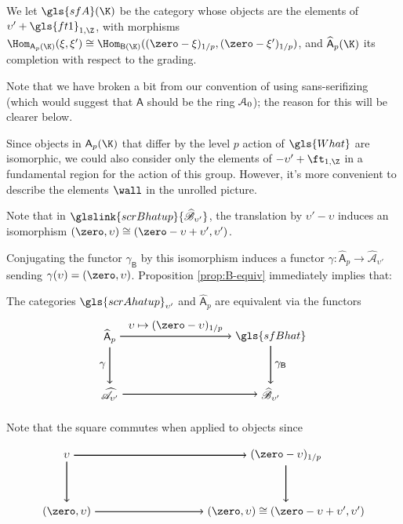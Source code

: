 \begin{definition}\label{def:sfA}
  We let $\gls{sfA}(\K)$ be the category whose objects are 
 the elements of $\upsilon'+\gls{ft1}_{1,\Z}$, with morphisms 
 $\Hom_{ \mathsf{A}_p(\K)}(\xi,\xi')\cong
 \Hom_{\mathsf{B}(\K)}((\zero-\xi)_{1/p}, (\zero-\xi')_{1/p})$, and
 $\widehat{\mathsf{A}}_p (\K)$ its completion with respect to the grading. 
\end{definition}
 Note that we have broken a bit from our convention of using sans-serifizing (which would suggest that $\mathsf{A}$ should be the ring $\EuScript{A}_0$); the reason for this will be clearer below.

Since objects in $\mathsf{A}_p(\K)$ that differ by the level $p$ action of $\gls{What}$ are
isomorphic, we could also consider only the elements  of
$-\upsilon'+\ft_{1,\Z}$ in a fundamental region for the action of this group.  However, it's more convenient to describe the elements $\wall$ in the unrolled picture.  




Note that in $\glslink{scrBhatup}{\widehat{\mathscr{B}}_{\upsilon'}}$,  the translation by
$\upsilon'-\upsilon $ induces an isomorphism
$(\zero ,\upsilon)\cong (\zero-\upsilon+\upsilon', \upsilon')$.  

Conjugating the functor $\gamma_{\mathsf{B}}$ by this isomorphism induces a functor $\gamma\colon
\widehat{\mathsf{A}}_p \to\widehat{\mathscr{A}}_{\upsilon'} $ sending $\gamma(\upsilon)=(\zero,\upsilon)$.  Proposition \ref{prop:B-equiv} immediately implies that:
\begin{theorem}\label{thm:pStein-equiv}
  The categories $\gls{scrAhatup}_{\upsilon'}$ and
  $\widehat{\mathsf{A}}_p$ are equivalent via the functors
 \[\tikz[->,thick]{
\matrix[row sep=12mm,column sep=35mm,ampersand replacement=\&]{
\node (d) {$\widehat{\mathsf{A}}_p$}; \& \node (e)
{$\gls{sfBhat}$}; \\
\node (a) {$\widehat{\mathscr{A}}_{\upsilon'}$}; \& \node (b)
{$\widehat{\mathscr{B}}_{\upsilon'}$}; \\
};
\draw (a) -- (b) ; 
\draw (d) -- (a) node[left,midway]{$\gamma$} ; 
\draw (e) -- (b) node[right,midway]{$\gamma_{\mathsf{B}}$}; 
\draw (d) -- (e) node[above,midway]{$\upsilon\mapsto (\zero-\upsilon)_{1/p}$}; 
}\]
\end{theorem}
Note that the square commutes when applied to objects since
 \[\tikz[->,thick]{
\matrix[row sep=12mm,column sep=35mm,ampersand replacement=\&]{
\node (d) {$\upsilon$}; \& \node (e)
{$(\zero-\upsilon)_{1/p}$}; \\
\node (a) {$(\zero,\upsilon)$}; \& \node (b)
{$(\zero,\upsilon)\cong (\zero-\upsilon+\upsilon',\upsilon')$}; \\
};
\draw (a) -- (b) ; 
\draw (d) -- (a) ; 
\draw (e) -- (b); 
\draw (d) -- (e); 
}\]

